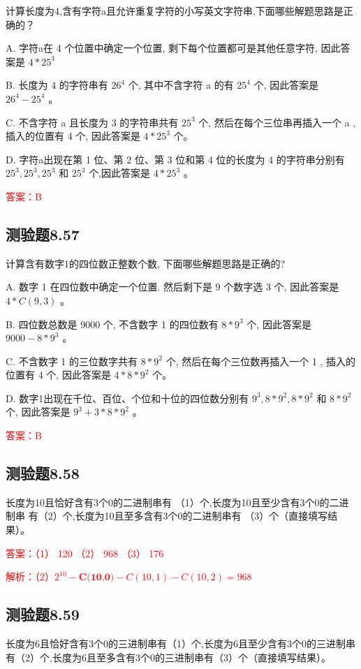 \documentclass[UTF8, heading=true]{ctexart}
\begin{document}
计算长度为4,含有字符a且允许重复字符的小写英文字符串,下面哪些解题思路是正确的？

A. 字符a在 4 个位置中确定一个位置, 剩下每个位置都可是其他任意字符, 因此答案是 $4 * 25^3$ 

B. 长度为 4 的字符串有 $26^4$ 个, 其中不含字符 a 的有 $25^4$ 个, 因此答案是 $26^4-25^4$ 。

C. 不含字符 a 且长度为 3 的字符串共有 $25^3$ 个, 然后在每个三位串再插入一个 a , 插入的位置有 4 个, 因此答案是 $4 * 25^3$ 个。

D. 字符a出现在第 1 位、第 2 位、第 3 位和第 4 位的长度为 4 的字符串分别有 $25^3, 25^3, 25^3$ 和 $25^3$ 个,因此答案是 $4 * 25^3$ 。

\textcolor{red}{答案：B}

\subsection{测验题8.57}
计算含有数字1的四位数正整数个数, 下面哪些解题思路是正确的?

A. 数字 1 在四位数中确定一个位置. 然后剩下是 9 个数字选 3 个, 因此答案是 $4 * C(9,3)$ 。

B. 四位数总数是 9000 个, 不含数字 1 的四位数有 $8 * 9^3$ 个, 因此答案是 $9000-8 * 9^3$ 。

C. 不含数字 1 的三位数字共有 $8 * 9^2$ 个, 然后在每个三位数再插入一个 1 , 插入的位置有 4 个, 因此答案是 $4 * 8 * 9^2$ 个。

D. 数字1出现在千位、百位、个位和十位的四位数分别有 $9^3, 8 * 9^2, 8 * 9^2$ 和 $8 * 9^2$ 个, 因此答案是 $9^3+3 * 8 * 9^2$ 。

\textcolor{red}{答案：B}

\subsection{测验题8.58}

长度为10且恰好含有3个0的二进制串有
（1）个,长度为10且至少含有3个0的二进制串
有（2）个,长度为10且至多含有3个0的二进制串有
（3）个（直接填写结果）。

\textcolor{red}{答案：（1） 120 （2） 968 （3） 176}

\textcolor{red}{解析：（2）$2^{10}-\textbf{C(10,0)}-C(10,1)-C(10,2)=968$}

\subsection{测验题8.59}

长度为6且恰好含有3个0的三进制串有（1）个,长度为6且至少含有3个0的三进制串有（2）个,长度为6且至多含有3个0的三进制串有（3）个（直接填写结果）。
\end{document}
